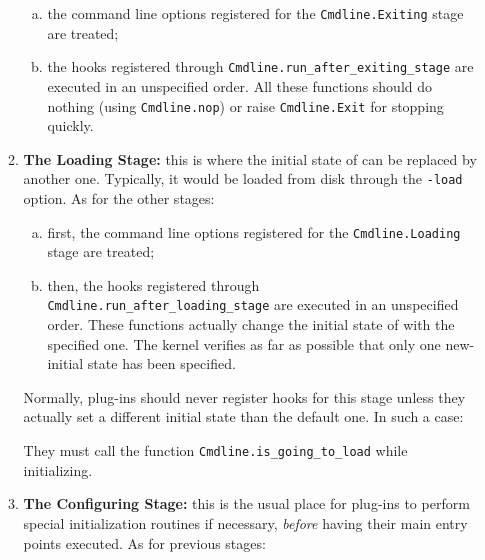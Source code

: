 \begin{enumerate}[A --]
\begin{enumerate}[1.]
\begin{enumerate}[(a)]
  \item the command line options registered for the
    \texttt{Cmdline.Exiting} stage
    are treated;

  \item the hooks registered through
    \texttt{Cmdline.run\_after\_exiting\_stage}
     are executed in
    an unspecified order. All these functions should do nothing (using
    \texttt{Cmdline.nop}) or raise
    \texttt{Cmdline.Exit} for stopping \framac
    quickly.

  \end{enumerate}

\item \textbf{The Loading Stage:} this is where the initial state of \framac
  can be replaced by another one. Typically, it would be loaded from disk
  through the \texttt{-load} option. As
  for the other stages:
  \begin{enumerate}[(a)]

  \item first, the command line options registered for the
    \texttt{Cmdline.Loading} stage
    are treated;

  \item then, the hooks registered through
    \texttt{Cmdline.run\_after\_loading\_stage}
     are executed in
    an unspecified order. These functions actually change the initial
    state of \framac with the specified one. The \framac kernel
    verifies as far as possible that only one new-initial state has
    been specified.
  \end{enumerate}

  Normally, plug-ins should never register hooks for this stage unless they
  actually set a different initial state than the default one. In such a case:

  \begin{important}
    They must call the function
    \texttt{Cmdline.is\_going\_to\_load}
     while initializing.
  \end{important}

\item \textbf{The Configuring Stage:} this is the usual place for
  plug-ins to perform special initialization routines if necessary,
  \emph{before} having their main entry points executed. As for
  previous stages:


\end{enumerate}
\end{enumerate}
